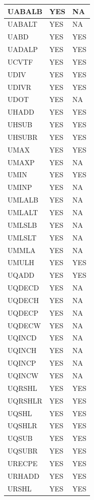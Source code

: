\begin{longtable}{|l|l|l|}
\hline
UABALB & YES & NA\\
\hline
UABALT & YES & NA\\
\hline
UABD & YES & YES\\
\hline
UADALP & YES & YES\\
\hline
UCVTF & YES & YES\\
\hline
UDIV & YES & YES\\
\hline
UDIVR & YES & YES\\
\hline
UDOT & YES & NA\\
\hline
UHADD & YES & YES\\
\hline
UHSUB & YES & YES\\
\hline
UHSUBR & YES & YES\\
\hline
UMAX & YES & YES\\
\hline
UMAXP & YES & NA\\
\hline
UMIN & YES & YES\\
\hline
UMINP & YES & NA\\
\hline
UMLALB & YES & NA\\
\hline
UMLALT & YES & NA\\
\hline
UMLSLB & YES & NA\\
\hline
UMLSLT & YES & NA\\
\hline
UMMLA & YES & NA\\
\hline
UMULH & YES & YES\\
\hline
UQADD & YES & YES\\
\hline
UQDECD & YES & NA\\
\hline
UQDECH & YES & NA\\
\hline
UQDECP & YES & NA\\
\hline
UQDECW & YES & NA\\
\hline
UQINCD & YES & NA\\
\hline
UQINCH & YES & NA\\
\hline
UQINCP & YES & NA\\
\hline
UQINCW & YES & NA\\
\hline
UQRSHL & YES & YES\\
\hline
UQRSHLR & YES & YES\\
\hline
UQSHL & YES & YES\\
\hline
UQSHLR & YES & YES\\
\hline
UQSUB & YES & YES\\
\hline
UQSUBR & YES & YES\\
\hline
URECPE & YES & YES\\
\hline
URHADD & YES & YES\\
\hline
URSHL & YES & YES\\

\end{longtable}
